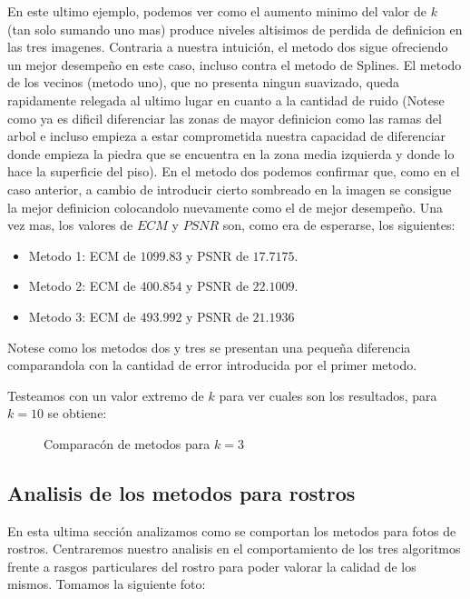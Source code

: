 En este ultimo ejemplo, podemos ver como el aumento minimo del valor de $k$ (tan solo sumando uno mas) produce niveles altisimos de perdida de definicion en las tres imagenes. Contraria a nuestra intuición, el metodo dos sigue ofreciendo un mejor desempeño en este caso, incluso contra el metodo de Splines. El metodo de los vecinos (metodo uno), que no presenta ningun suavizado, queda rapidamente relegada al ultimo lugar en cuanto a la cantidad de ruido (Notese como ya es dificil diferenciar las zonas de mayor definicion como las ramas del arbol e incluso empieza a estar comprometida nuestra capacidad de diferenciar donde empieza la piedra que se encuentra en la zona media izquierda y donde lo hace la superficie del piso). En el metodo dos podemos confirmar que, como en el caso anterior, a cambio de introducir cierto sombreado en la imagen se consigue la mejor definicion colocandolo nuevamente como el de mejor desempeño.
Una vez mas, los valores de $ECM$ y $PSNR$ son, como era de esperarse, los siguientes:
\begin{itemize}
 \item Metodo 1: ECM de $1099.83$ y PSNR de $17.7175$.
 \item Metodo 2: ECM de $400.854$ y PSNR de $22.1009$.
 \item Metodo 3: ECM de $493.992$ y PSNR de $21.1936$
\end{itemize}
Notese como los metodos dos y tres se presentan una pequeña diferencia comparandola con la cantidad de error introducida por el primer metodo.

Testeamos con un valor extremo de $k$ para ver cuales son los resultados, para $k=10$ se obtiene:

\begin{figure}[H]
    \centering
    \qquad
    \qquad
    \caption{Comparacón de metodos para $k = 3$}%
    \label{fig:example}%
\end{figure}



\subsection{Analisis de los metodos para rostros}


En esta ultima sección analizamos como se comportan los metodos para fotos de rostros. Centraremos nuestro analisis en el comportamiento de los tres algoritmos frente a rasgos particulares del rostro para poder valorar la calidad de los mismos. Tomamos la siguiente foto:

